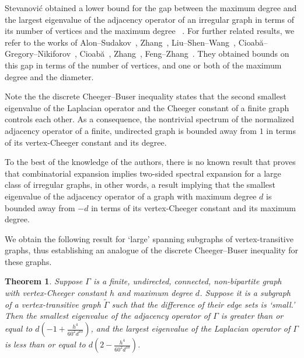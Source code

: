 \documentclass[10pt]{article}
\newtheorem{theorem}{Theorem}[section]
\theoremstyle{definition}
\begin{document}
Stevanovi\'{c} obtained a lower bound for the gap between the maximum degree and the largest eigenvalue of the adjacency operator of an irregular graph in terms of its number of vertices and the maximum degree ~\cite{StevanovicLargestEigenValueNonregGraphs}. 
For further related results, we refer to the works of 
Alon--Sudakov~\cite{AlonSudakovBipartiteSubgraphsSmallestEigenVal}, 
 Zhang~\cite{ZhangEigenVectEigenValNonRegGraph}, Liu--Shen--Wang~\cite{LiuShenWangLargestEigenValNonRegGraph}, Cioab\u{a}--Gregory--Nikiforov~\cite{CioabaGregoryNikiforovExtremeEigenvalNonRegGraph}, Cioab\u{a}~\cite{CioabaSpecRedMaxDegIrrGraphs}, Zhang~\cite{ZhangNewResultSpecRadiusIrregGraph}, Feng--Zhang~\cite{FengZhangNoteSpectralRadiusMaxDegreeIrreg}. They obtained bounds on this gap in terms of the number of vertices, and one or both of the maximum degree and the diameter. 

Note the the discrete Cheeger--Buser inequality states that the second smallest eigenvalue of the Laplacian operator and the Cheeger constant of a finite graph controls each other. As a consequence, the nontrivial spectrum of the normalized adjacency operator of a finite, undirected graph is bounded away from $1$ in terms of its vertex-Cheeger constant  and its degree. 

To the best of the knowledge of the authors, there is no known result that proves that combinatorial expansion implies two-sided spectral expansion for a large class of irregular graphs, in other words, a result implying that the smallest eigenvalue of the adjacency operator of a graph with maximum degree $d$ is bounded away from $-d$ in terms of its vertex-Cheeger constant and its maximum degree. 




We obtain the following result for `large' spanning subgraphs of vertex-transitive graphs, thus establishing an analogue of the discrete Cheeger--Buser inequality for these graphs.

\begin{theorem}
\label{Thm:IntroIrr}
Suppose $\Gamma$ is a finite, undirected, connected, non-bipartite graph with vertex-Cheeger constant $h$ and maximum degree $d$. Suppose it is a subgraph of a vertex-transitive graph $\widetilde \Gamma$ such that the difference of their edge sets is `small.' Then the smallest eigenvalue of the adjacency operator of $\Gamma$ is greater than or equal to $ d \left(-1 + \frac{h^4 }{60^2 d^{10}}\right)$, and the largest eigenvalue of the Laplacian operator of $\Gamma$ is less than or equal to $d \left(2 -  \frac{h^4 }{60^2 d^{10}}\right)$. 
\end{theorem}
\end{document}
